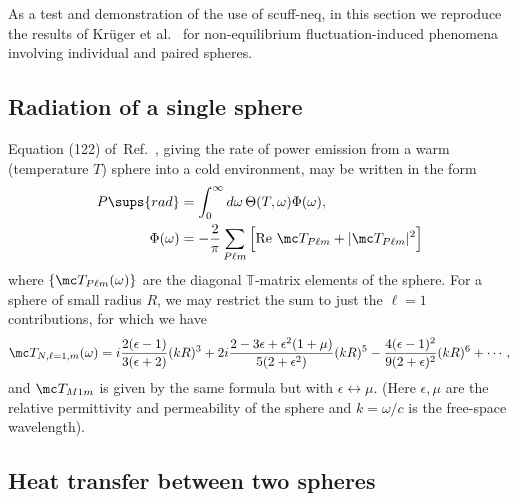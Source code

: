 \documentclass[letterpaper]{article}
\newcommand{\citeasnoun}[1]{Ref.~\citenum{#1}}
\begin{document}
As a test and demonstration of the use of {\sc scuff-neq},
in this section we reproduce the results of
Kr\"uger et al.~\cite{Kruger2012} for non-equilibrium
fluctuation-induced phenomena involving individual and paired spheres.

\subsection{Radiation of a single sphere}

Equation (122) of~\citeasnoun{Kruger2012},
giving the rate of power emission from a warm
(temperature $T$) sphere into a cold environment, 
may be written in the form
\begin{align*}
 P\sups{rad} 
  &= 
 \int_0^\infty d\omega \, \Theta(T,\omega) \Phi(\omega),
\\
 \Phi(\omega) 
 &= 
  -\frac{2}{\pi}\sum_{P \ell m}
 \Big[ \text{Re }\mc T_{P \ell m} + |\mc T_{P \ell m}|^2\Big]
\end{align*}
where $\{\mc T_{P \ell m}(\omega)\}$ are the 
diagonal $\mathbb T$-matrix elements of the sphere.
For a sphere of small radius $R$,
we may restrict the sum to just the 
$\ell=1$ contributions, for which 
we have~\cite{Kruger2012}
$$ \mc T_{N, \ell=1, m}(\omega)
   =   i\frac{2(\epsilon-1)}{3(\epsilon+2)}(kR)^3
     +2i\frac{2-3\epsilon+\epsilon^2(1+\mu)}
             {5(2+\epsilon^2)}(kR)^5
     -\frac{4(\epsilon-1)^2}{9(2+\epsilon)^2}(kR)^6
   + \cdots,
$$
and $\mc T_{M1m}$ is given by the same formula but 
with $\epsilon \leftrightarrow \mu$.
(Here $\epsilon, \mu$ are the relative
permittivity and permeability of the sphere and 
$k=\omega/c$ is the free-space wavelength).

\subsection{Heat transfer between two spheres}
\end{document}

